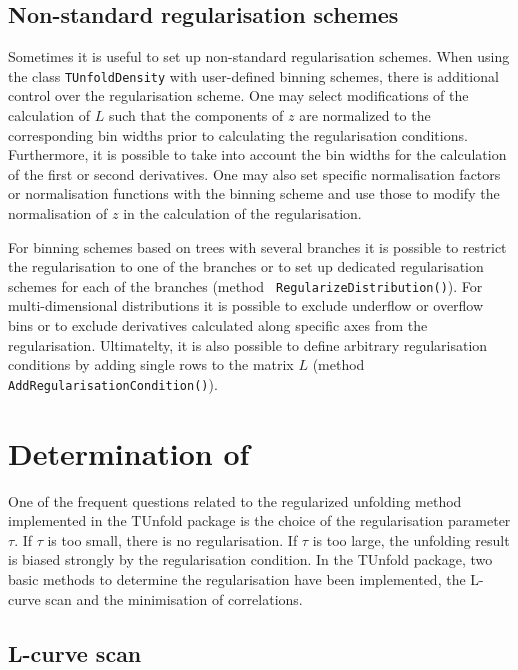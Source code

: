 \documentclass[12pt]{article}
\begin{document}
\subsection{Non-standard regularisation schemes}

Sometimes it is useful to set up non-standard regularisation
schemes. When using the class {\tt TUnfoldDensity} with user-defined
binning schemes, there is additional control over the regularisation
scheme. One may select modifications of the calculation of $L$ such
that the components of $z$ are normalized to the corresponding bin widths
prior to calculating the regularisation conditions. Furthermore, it is
possible to take into account the bin widths for the calculation of
the first or second derivatives. One may also set specific
normalisation factors or normalisation functions with the binning
scheme and use those to modify the normalisation of $z$ in the
calculation of the regularisation. 

For binning schemes based on trees with several branches it is possible
to restrict the regularisation to one of the branches or to set up
dedicated regularisation schemes for each of the branches (method {\tt
RegularizeDistribution()}).
For multi-dimensional distributions it is possible to exclude
underflow or overflow bins or to exclude derivatives calculated along
specific axes from the regularisation. Ultimatelty, it is also
possible to define arbitrary regularisation conditions by adding
single rows to the matrix $L$ (method {\tt AddRegularisationCondition()}).

\section{Determination of \protect\boldmath{$\tau$}}

One of the frequent questions related to the regularized unfolding method
implemented in the TUnfold package is the choice of the regularisation
parameter $\tau$. If $\tau$ is too small, there is no
regularisation. If $\tau$ is too large, the unfolding result is
biased strongly by the regularisation condition. In the TUnfold
package, two basic methods to determine the regularisation have been
implemented, the L-curve scan and the minimisation of
correlations.

\subsection{L-curve scan}
\end{document}
